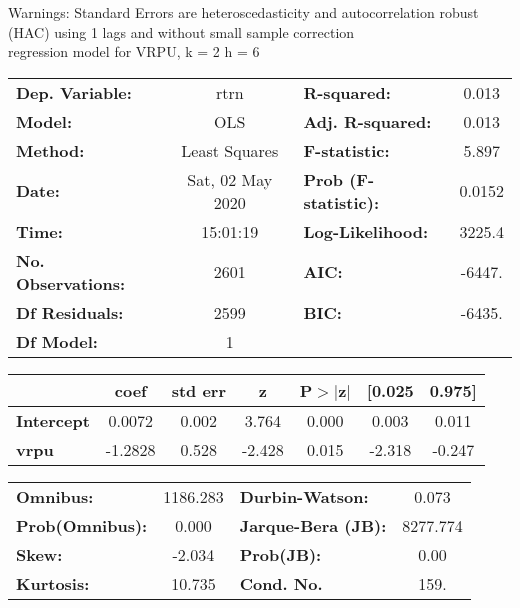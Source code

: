 Warnings: \newline
 [1] Standard Errors are heteroscedasticity and autocorrelation robust (HAC) using 1 lags and without small sample correction\\ 

regression model for VRPU, k = 2 h = 6\begin{center}
\begin{tabular}{lclc}
\toprule
\textbf{Dep. Variable:}    &       rtrn       & \textbf{  R-squared:         } &     0.013   \\
\textbf{Model:}            &       OLS        & \textbf{  Adj. R-squared:    } &     0.013   \\
\textbf{Method:}           &  Least Squares   & \textbf{  F-statistic:       } &     5.897   \\
\textbf{Date:}             & Sat, 02 May 2020 & \textbf{  Prob (F-statistic):} &   0.0152    \\
\textbf{Time:}             &     15:01:19     & \textbf{  Log-Likelihood:    } &    3225.4   \\
\textbf{No. Observations:} &        2601      & \textbf{  AIC:               } &    -6447.   \\
\textbf{Df Residuals:}     &        2599      & \textbf{  BIC:               } &    -6435.   \\
\textbf{Df Model:}         &           1      & \textbf{                     } &             \\
\bottomrule
\end{tabular}
\begin{tabular}{lcccccc}
                   & \textbf{coef} & \textbf{std err} & \textbf{z} & \textbf{P$> |$z$|$} & \textbf{[0.025} & \textbf{0.975]}  \\
\midrule
\textbf{Intercept} &       0.0072  &        0.002     &     3.764  &         0.000        &        0.003    &        0.011     \\
\textbf{vrpu}      &      -1.2828  &        0.528     &    -2.428  &         0.015        &       -2.318    &       -0.247     \\
\bottomrule
\end{tabular}
\begin{tabular}{lclc}
\textbf{Omnibus:}       & 1186.283 & \textbf{  Durbin-Watson:     } &    0.073  \\
\textbf{Prob(Omnibus):} &   0.000  & \textbf{  Jarque-Bera (JB):  } & 8277.774  \\
\textbf{Skew:}          &  -2.034  & \textbf{  Prob(JB):          } &     0.00  \\
\textbf{Kurtosis:}      &  10.735  & \textbf{  Cond. No.          } &     159.  \\
\bottomrule
\end{tabular}
\end{center}

